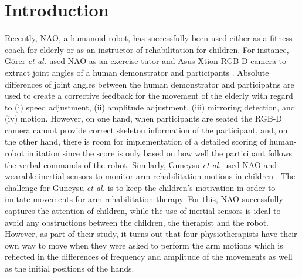 \documentclass{sig-alternate-05-2015}
\begin{document}


%
%

%
%
\printccsdesc



\section{Introduction}
Recently, NAO, a humanoid robot, has successfully been used either as a fitness coach for elderly 
or as an instructor of rehabilitation for children.
For instance, G{\"{o}}rer \textit{et al.} used NAO as an exercise tutor
and Asus Xtion RGB-D camera to extract joint angles of a human demonstrator and participants \cite{Gorer2016}.
Absolute differences of joint angles between the human demonstrator and participatns
are used to create a corrective feedback for the movement of the elderly 
with regard to (i) speed adjustment, (ii) amplitude adjustment, (iii) mirroring detection, and (iv) motion.
However, on one hand, when participants are seated the RGB-D camera cannot provide correct skeleton information
of the participant,
and, on the other hand, there is room for implementation of a detailed scoring of human-robot imitation
since the score is only based on how well the participant follows the verbal commands of the robot.
Similarly, Guneysu \textit{et al.} used NAO and wearable inertial sensors
to monitor arm rehabilitation motions in children \cite{Guneysu2015}.
The challenge for Guneysu \textit{et al.} is to keep the children's motivation in order to imitate 
movements for arm rehabilitation therapy. 
For this, NAO successfully captures the attention of children,
while the use of inertial sensors is ideal to avoid any  
obstructions between the children, the therapist and  the robot.
However, as part of their study, it turns out that four physiotherapists have their own way to move
when they were asked to perform the arm motions
which is reflected in the differences of frequency and amplitude of the movements
as well as the initial positions of the hands.
\end{document}
